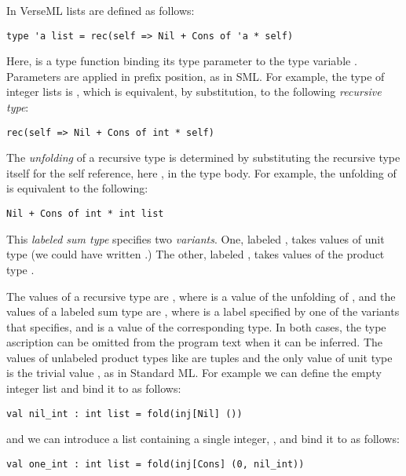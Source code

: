 In VerseML lists are defined as follows:
\begin{lstlisting}[numbers=none]
type 'a list = rec(self => Nil + Cons of 'a * self)
\end{lstlisting}
Here,  is a {type function} binding its type parameter to the type variable . Parameters are applied in prefix position, as in SML. For example, the type of integer lists is , which is equivalent, by substitution, to the following \emph{recursive type}:
\begin{lstlisting}[numbers=none]
rec(self => Nil + Cons of int * self)
\end{lstlisting}
The \emph{unfolding} of a recursive type is determined by substituting the recursive type itself for the self reference, here , in the type body. For example, the unfolding of  is equivalent to the following:
\begin{lstlisting}[numbers=none]
Nil + Cons of int * int list
\end{lstlisting}
This \emph{labeled sum type} specifies two \emph{variants}. One, labeled , takes values of unit type (we could have written .) The other, labeled , takes values of the product type .

The values of a recursive type  are , where  is a value of the unfolding of , and the values of a labeled sum type  are , where  is a label specified by one of the variants that  specifies, and  is a value of the corresponding type. In both cases, the type ascription can be omitted from the program text when it can be inferred. The values of unlabeled product types like  are tuples and the only value of unit type is the trivial value \li{()}, as in Standard ML. 
For example we can define the empty integer list and bind it to  as follows:
\begin{lstlisting}[numbers=none]
val nil_int : int list = fold(inj[Nil] ())
\end{lstlisting}
and we can introduce a list containing a single integer, , and bind it to  as follows:
\begin{lstlisting}[numbers=none]
val one_int : int list = fold(inj[Cons] (0, nil_int))
\end{lstlisting}

